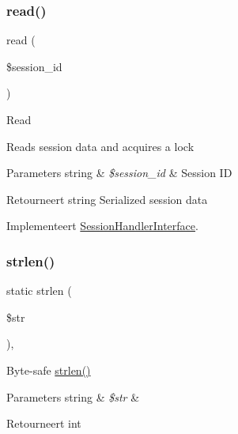 \subsubsection{\texorpdfstring{read()}{read()}}
{\footnotesize\ttfamily read (\begin{DoxyParamCaption}\item[{}]{\$session\+\_\+id }\end{DoxyParamCaption})}

Read

Reads session data and acquires a lock


\begin{DoxyParams}[1]{Parameters}
string & {\em \$session\+\_\+id} & Session ID \\
\hline
\end{DoxyParams}
\begin{DoxyReturn}{Retourneert}
string Serialized session data 
\end{DoxyReturn}


Implementeert \mbox{\hyperlink{interface_session_handler_interface}{Session\+Handler\+Interface}}.

\mbox{\label{class_c_i___session__files__driver_a4c29a687d4ed62c26a10e41d98930d5f}} 
\subsubsection{\texorpdfstring{strlen()}{strlen()}}
{\footnotesize\ttfamily static strlen (\begin{DoxyParamCaption}\item[{}]{\$str }\end{DoxyParamCaption})\hspace{0.3cm}{\ttfamily [static]}, {\ttfamily [protected]}}

Byte-\/safe \mbox{\hyperlink{class_c_i___session__files__driver_a4c29a687d4ed62c26a10e41d98930d5f}{strlen()}}


\begin{DoxyParams}[1]{Parameters}
string & {\em \$str} & \\
\hline
\end{DoxyParams}
\begin{DoxyReturn}{Retourneert}
int 
\end{DoxyReturn}
\mbox{\label{class_c_i___session__files__driver_a7bee5f3a24cb93e5a7fc371e05046f20}} 
